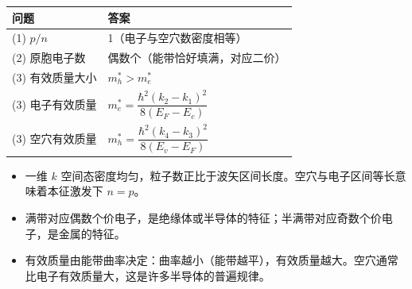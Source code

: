 \begin{formulabox}[答案汇总]
\begin{center}
\begin{tabular}{ll}
\toprule
\textbf{问题} & \textbf{答案} \\
\midrule
(1) $p/n$ & 1（电子与空穴数密度相等） \\
(2) 原胞电子数 & 偶数个（能带恰好填满，对应二价） \\
(3) 有效质量大小 & $m_h^*>m_e^*$ \\
(3) 电子有效质量 & $m_e^*=\dfrac{\hbar^2(k_2-k_1)^2}{8(E_F-E_c)}$ \\
(3) 空穴有效质量 & $m_h^*=\dfrac{\hbar^2(k_4-k_3)^2}{8(E_v-E_F)}$ \\
\bottomrule
\end{tabular}
\end{center}
\end{formulabox}

\begin{insightbox}[物理图像]
\begin{itemize}
    \item 一维 $k$ 空间态密度均匀，粒子数正比于波矢区间长度。空穴与电子区间等长意味着本征激发下 $n=p$。
    \item 满带对应偶数个价电子，是绝缘体或半导体的特征；半满带对应奇数个价电子，是金属的特征。
    \item 有效质量由能带曲率决定：曲率越小（能带越平），有效质量越大。空穴通常比电子有效质量大，这是许多半导体的普遍规律。
\end{itemize}
\end{insightbox}
